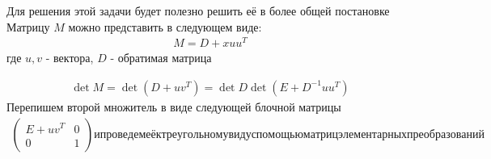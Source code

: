 \begin{sol}
    Для решения этой задачи будет полезно решить её в более общей постановке
    Матрицу $M$ можно представить в следующем виде:
    \begin{gather*}
        M =  D + x u u^{T}
    \end{gather*} где 
    $u, v$ - вектора, $D$ - обратимая матрица
    
    \begin{gather*}
        \det M = \det\left(D +  u v^{T}\right) = \det D \det (E + D^{-1} u u^{T})
    \end{gather*}
    Перепишем второй множитель в виде следующей блочной матрицы
    \begin{gather*}
        \left(
        \begin{array}{cc}
            E +  u v^{T} &  0\\
           0  & 1
        \end{array}
        \right)
        и проведем её к треугольному виду с помощью матриц элементарных преобразований
    \end{gather*}
    

\end{sol}
